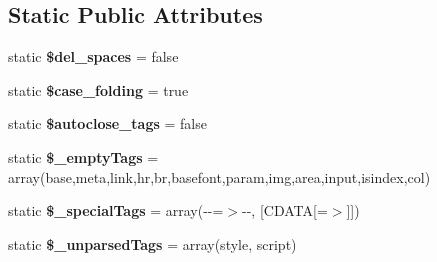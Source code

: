 \subsection*{Static Public Attributes}
\begin{DoxyCompactItemize}
\item 
\mbox{\label{classduzun_1_1hQuery_1_1HTML__Parser_aced2d66ba9dfc865f88e644c2f2109b9}} 
static {\bfseries \$del\+\_\+spaces} = false
\item 
\mbox{\label{classduzun_1_1hQuery_1_1HTML__Parser_aa7e1d946650f5be17c708bdc547b47bd}} 
static {\bfseries \$case\+\_\+folding} = true
\item 
\mbox{\label{classduzun_1_1hQuery_1_1HTML__Parser_ad6893025b0552db0488b86294e9f6036}} 
static {\bfseries \$autoclose\+\_\+tags} = false
\item 
\mbox{\label{classduzun_1_1hQuery_1_1HTML__Parser_a03b01800ba00cf4e32f225205d30b3b2}} 
static {\bfseries \$\+\_\+empty\+Tags} = array(\textquotesingle{}base\textquotesingle{},\textquotesingle{}meta\textquotesingle{},\textquotesingle{}link\textquotesingle{},\textquotesingle{}hr\textquotesingle{},\textquotesingle{}br\textquotesingle{},\textquotesingle{}basefont\textquotesingle{},\textquotesingle{}param\textquotesingle{},\textquotesingle{}img\textquotesingle{},\textquotesingle{}area\textquotesingle{},\textquotesingle{}input\textquotesingle{},\textquotesingle{}isindex\textquotesingle{},\textquotesingle{}col\textquotesingle{})
\item 
\mbox{\label{classduzun_1_1hQuery_1_1HTML__Parser_ab04209a1c4d752d9b4e4f93e5e61b369}} 
static {\bfseries \$\+\_\+special\+Tags} = array(\textquotesingle{}-\/-\/\textquotesingle{}=$>$\textquotesingle{}-\/-\/\textquotesingle{}, \textquotesingle{}\mbox{[}C\+D\+A\+TA\mbox{[}\textquotesingle{}=$>$\textquotesingle{}\mbox{]}\mbox{]}\textquotesingle{})
\item 
\mbox{\label{classduzun_1_1hQuery_1_1HTML__Parser_a2355aaddc0f7b4861269750ae7bccac2}} 
static {\bfseries \$\+\_\+unparsed\+Tags} = array(\textquotesingle{}style\textquotesingle{}, \textquotesingle{}script\textquotesingle{})

\end{DoxyCompactItemize}
